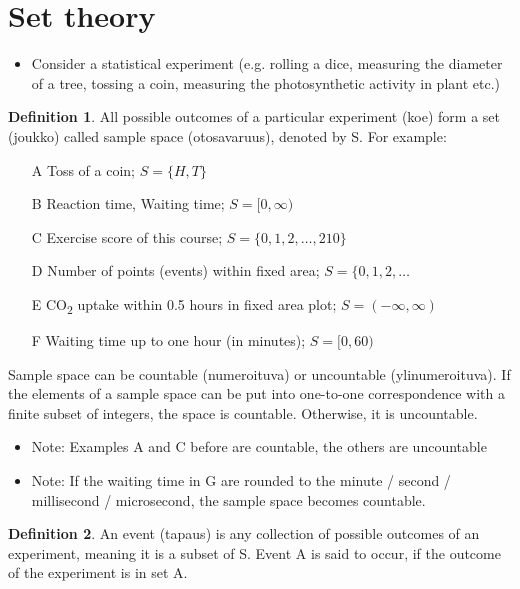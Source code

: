 \documentclass[10pt, twoside, a4paper]{book}
\theoremstyle{definition}
\newtheorem{definition}{Definition}[chapter]
\begin{document}
\section{Set theory}
\begin{itemize}
	\item Consider a statistical experiment (e.g. rolling a dice, measuring the
	diameter of a tree, tossing a coin, measuring the photosynthetic activity in plant etc.)
\end{itemize}
\begin{definition}
All possible outcomes of a particular experiment (koe) form a set
(joukko) called sample space (otosavaruus), denoted by S. For example:

\begin{itemize}
  \item[A] Toss of a coin; $ S = \{H, T\} $
  \item[B] Reaction time, Waiting time; $ S = [0, \infty) $
  \item[C] Exercise score of this course; $ S = \{0,1,2,\ldots,210\} $
  \item[D] Number of points (events) within fixed area; $ S = \{0,1,2,\ldots $
  \item[E] CO\textsubscript{2} uptake within 0.5 hours in fixed area plot; $ S =
  (-\infty, \infty) $
  \item[F] Waiting time up to one hour (in minutes); $ S = [0, 60) $
\end{itemize}

Sample space can be countable (numeroituva) or uncountable (ylinumeroituva). If
the elements of a sample space can be put into one-to-one correspondence with a
finite subset of integers, the space is countable. Otherwise, it is uncountable.
\end{definition}
\begin{itemize}
  \item Note: Examples A and C before are countable, the others are uncountable
  \item Note: If the waiting time in G are rounded to the
  minute / second / millisecond / microsecond, the sample space becomes
  countable.
\end{itemize}
\begin{definition}
An event (tapaus) is any collection of possible outcomes of an experiment,
meaning it is a subset of S. Event A is said to occur, if the outcome of the experiment is in set A.
\end{definition}
\end{document}
